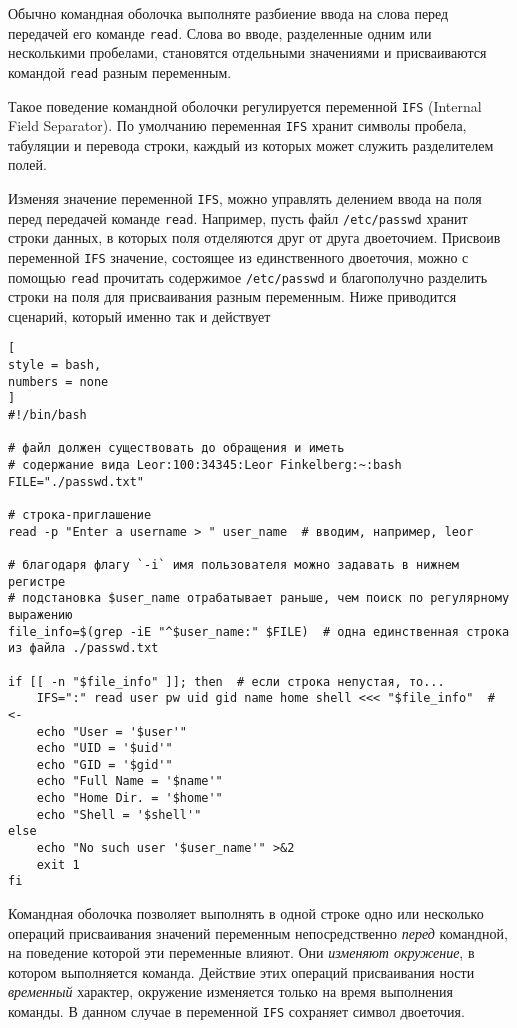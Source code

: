 \documentclass[%
	11pt,
	a4paper,
	utf8,
		]{article}
\begin{document}
Обычно командная оболочка выполняте разбиение ввода на слова перед передачей его команде \texttt{read}. Слова во вводе, разделенные одним или несколькими пробелами, становятся отдельными значениями и присваиваются командой \texttt{read} разным переменным.

Такое поведение командной оболочки регулируется переменной \texttt{IFS} (Internal Field Separator). По умолчанию переменная \texttt{IFS} хранит символы пробела, табуляции и перевода строки, каждый из которых может служить разделителем полей.

Изменяя значение переменной \texttt{IFS}, можно управлять делением ввода на поля перед передачей команде \texttt{read}. Например, пусть файл \verb|/etc/passwd| хранит строки данных, в которых поля отделяются друг от друга двоеточием. Присвоив переменной \texttt{IFS} значение, состоящее из единственного двоеточия, можно с помощью \texttt{read} прочитать содержимое \verb|/etc/passwd| и благополучно разделить строки на поля для присваивания разным переменным. Ниже приводится сценарий, который именно так и действует
\begin{lstlisting}[
style = bash,
numbers = none
]
#!/bin/bash

# файл должен существовать до обращения и иметь
# содержание вида Leor:100:34345:Leor Finkelberg:~:bash
FILE="./passwd.txt"

# строка-приглашение
read -p "Enter a username > " user_name  # вводим, например, leor

# благодаря флагу `-i` имя пользователя можно задавать в нижнем регистре
# подстановка $user_name отрабатывает раньше, чем поиск по регулярному выражению
file_info=$(grep -iE "^$user_name:" $FILE)  # одна единственная строка из файла ./passwd.txt

if [[ -n "$file_info" ]]; then  # если строка непустая, то...
    IFS=":" read user pw uid gid name home shell <<< "$file_info"  # <-
    echo "User = '$user'"
    echo "UID = '$uid'"
    echo "GID = '$gid'"
    echo "Full Name = '$name'"
    echo "Home Dir. = '$home'"
    echo "Shell = '$shell'"
else
    echo "No such user '$user_name'" >&2
    exit 1
fi
\end{lstlisting}

Командная оболочка позволяет выполнять в одной строке одно или несколько операций присваивания значений переменным непосредственно \emph{перед} командной, на поведение которой эти переменные влияют. Они \emph{изменяют окружение}, в котором выполняется команда. Действие этих операций присваивания ности \emph{временный} характер, окружение изменяется только на время выполнения команды. В данном случае в переменной \texttt{IFS} сохраняет символ двоеточия.
\end{document}
